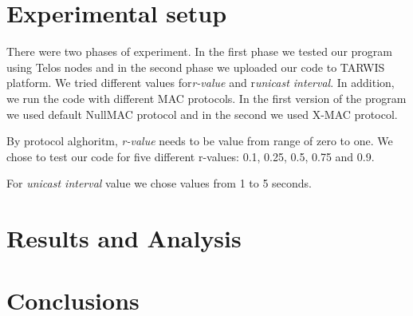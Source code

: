 \documentclass{llncs}
\begin{document}
\begin{comment}
Experimental setup/Measurement procedure: The experimental setup, the
differences of the experimental series, the different parameters used, including local
sensor setup and TARWIS testbed.
\end{comment}
\section{Experimental setup}
There were two phases of experiment. In the first phase we tested our program using Telos nodes and in the second phase we uploaded our code to TARWIS platform. We tried different values for\textit{r-value} and r\textit{unicast interval}. In addition, we run the code with different MAC protocols. In the first version of the program we used default NullMAC protocol and in the second we used X-MAC protocol. 

By protocol alghoritm, \textit{r-value} needs to be value from range of zero to one. We chose to test our code for five different r-values: 0.1, 0.25, 0.5, 0.75 and 0.9. 

For \textit{unicast interval} value we chose values from 1 to 5 seconds. 

\begin{comment}
Results and Analysis: Analyze the results which are obtained by local sensors and
on TARWIS testbed. Analyze your data with respect to the aim of the experiment. Your
task during the experiment is not just to measure and document your measurements, but
to derive and present conclusions from your measurements.
\end{comment}

\section{Results and Analysis}

\begin{comment}
Conclusions: Summarize and discuss your results with respect to the literature or
your own scientific expectations. You should in particular discuss possible error sources
and give a short judgment on the quality of the experimental setup (because you also
learn to design the measurement setups). If needed, suggest how to improve the setups.
\end{comment}

\section{Conclusions}
\end{document}
